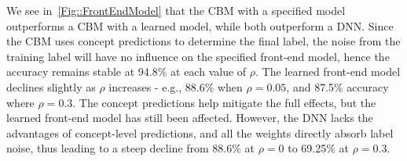 We see in~\cref{Fig::FrontEndModel} that the CBM with a specified model outperforms a CBM with a learned model, while both outperform a DNN. Since the CBM uses concept predictions to determine the final label, the noise from the training label will have no influence on the specified front-end model, hence the accuracy remains stable at 94.8\% at each value of $\rho$. The learned front-end model declines slightly as $\rho$ increases - e.g., 88.6\% when $\rho = 0.05$, and 87.5\% accuracy where $\rho = 0.3$. The concept predictions help mitigate the full effects, but the learned front-end model has still been affected. However, the DNN lacks the advantages of concept-level predictions, and all the weights directly absorb label noise, thus leading to a steep decline from 88.6\% at $\rho = 0$ to 69.25\% at $\rho = 0.3$.
